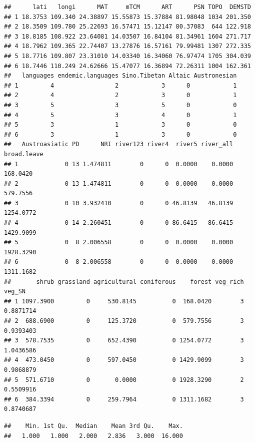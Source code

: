 \documentclass[12pt,]{article}
\newenvironment{Shaded}{\begin{snugshade}}{\end{snugshade}}
\newcommand{\KeywordTok}[1]{\textcolor[rgb]{0.13,0.29,0.53}{\textbf{#1}}}
\newcommand{\OperatorTok}[1]{\textcolor[rgb]{0.81,0.36,0.00}{\textbf{#1}}}
\newcommand{\NormalTok}[1]{#1}
\begin{document}
\begin{verbatim}
##      lati   longi      MAT     mTCM      ART      PSN TOPO  DEMSTD
## 1 18.3753 109.340 24.38897 15.55873 15.37884 81.98048 1034 201.350
## 2 18.3509 109.780 25.22693 16.57471 15.12147 80.37083  644 122.918
## 3 18.8185 108.922 23.64081 14.03507 16.84104 81.34961 1604 271.717
## 4 18.7962 109.365 22.74407 13.27876 16.57161 79.99481 1307 272.335
## 5 18.7716 109.807 23.31010 14.03340 16.34060 76.97474 1705 304.039
## 6 18.7446 110.249 24.62666 15.47077 16.36894 72.26311 1004 162.361
##   languages endemic.languages Sino.Tibetan Altaic Austronesian
## 1         4                 2            3      0            1
## 2         4                 2            3      0            1
## 3         5                 3            5      0            0
## 4         5                 3            4      0            1
## 5         3                 1            3      0            0
## 6         3                 1            3      0            0
##   Austroasiatic PD      NRI river123 river4  river5 river_all broad.leave
## 1             0 13 1.474811        0      0  0.0000    0.0000    168.0420
## 2             0 13 1.474811        0      0  0.0000    0.0000    579.7556
## 3             0 10 3.932410        0      0 46.8139   46.8139   1254.0772
## 4             0 14 2.260451        0      0 86.6415   86.6415   1429.9099
## 5             0  8 2.006558        0      0  0.0000    0.0000   1928.3290
## 6             0  8 2.006558        0      0  0.0000    0.0000   1311.1682
##       shrub grassland agricultural coniferous    forest veg_rich    veg_SN
## 1 1097.3900         0     530.8145          0  168.0420        3 0.8871714
## 2  688.6900         0     125.3720          0  579.7556        3 0.9393403
## 3  578.7535         0     652.4390          0 1254.0772        3 1.0436586
## 4  473.0450         0     597.0450          0 1429.9099        3 0.9868879
## 5  571.6710         0       0.0000          0 1928.3290        2 0.5509916
## 6  384.3394         0     259.7964          0 1311.1682        3 0.8740687
\end{verbatim}

\begin{Shaded}
\end{Shaded}

\begin{verbatim}
##    Min. 1st Qu.  Median    Mean 3rd Qu.    Max. 
##   1.000   1.000   2.000   2.836   3.000  16.000
\end{verbatim}
\end{document}
